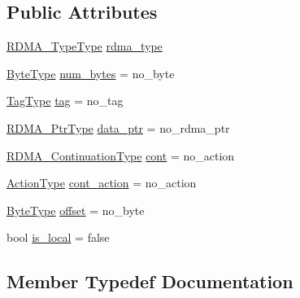 \subsection*{Public Attributes}
\begin{DoxyCompactItemize}
\item 
\hyperlink{namespacevt_1_1rdma_ac848e1d9da43db6294bd06f83e5d3946}{R\+D\+M\+A\+\_\+\+Type\+Type} \hyperlink{structvt_1_1rdma_1_1_info_a123ce7dd75200e49c67ba513802c6e53}{rdma\+\_\+type}
\item 
\hyperlink{namespacevt_aab8d55968084610ce3b17057981e9300}{Byte\+Type} \hyperlink{structvt_1_1rdma_1_1_info_a7fc15ac009aac83156f7d049e8594e2e}{num\+\_\+bytes} = no\+\_\+byte
\item 
\hyperlink{namespacevt_a84ab281dae04a52a4b243d6bf62d0e52}{Tag\+Type} \hyperlink{structvt_1_1rdma_1_1_info_a7d19beb6e7a0757aea7d3a16f610b6dd}{tag} = no\+\_\+tag
\item 
\hyperlink{namespacevt_aab05b4a584f7ee835a6d0f66915cf59b}{R\+D\+M\+A\+\_\+\+Ptr\+Type} \hyperlink{structvt_1_1rdma_1_1_info_aec27c1a908087b3c0d1b962ea2a763f8}{data\+\_\+ptr} = no\+\_\+rdma\+\_\+ptr
\item 
\hyperlink{namespacevt_a9880273f1697d78c2171f8d8f044de51}{R\+D\+M\+A\+\_\+\+Continuation\+Type} \hyperlink{structvt_1_1rdma_1_1_info_a6831ea562dafc8261c3cb2274a519b6b}{cont} = no\+\_\+action
\item 
\hyperlink{namespacevt_ae0a5a7b18cc99d7b732cb4d44f46b0f3}{Action\+Type} \hyperlink{structvt_1_1rdma_1_1_info_a402c9b74d2c6d2135630a3fbbc738ce8}{cont\+\_\+action} = no\+\_\+action
\item 
\hyperlink{namespacevt_aab8d55968084610ce3b17057981e9300}{Byte\+Type} \hyperlink{structvt_1_1rdma_1_1_info_aef5c7ca049c5559876969cb84f590a93}{offset} = no\+\_\+byte
\item 
bool \hyperlink{structvt_1_1rdma_1_1_info_aca2fbe3e10b689bba2ace9bed33bd5cb}{is\+\_\+local} = false
\end{DoxyCompactItemize}


\subsection{Member Typedef Documentation}
\mbox{\label{structvt_1_1rdma_1_1_info_afb608063c839ec0e8e124f3496542991}} 
